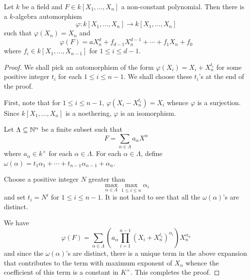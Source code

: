 \begin{lemma}
    Let $k$ be a field and $F\in k[X_1,\dots,X_n]$ a non-constant polynomial. Then there is a $k$-algebra automorphism 
    \begin{equation*}
        \varphi: k[X_1,\dots,X_n]\to k[X_1,\dots,X_n]
    \end{equation*}
    such that $\varphi(X_n) = X_n$ and 
    \begin{equation*}
        \varphi(F) = aX_n^d + f_{d - 1}X_n^{d - 1} + \cdots + f_1X_n + f_0
    \end{equation*}
    where $f_i\in k[X_1,\dots,X_{n - 1}]$ for $1\le i\le d - 1$.
\end{lemma}
\begin{proof}
    We shall pick an automorphism of the form $\varphi(X_i) = X_i + X_n^{t_i}$ for some positive integer $t_i$ for each $1\le i\le n - 1$. We shall choose these $t_i$'s at the end of the proof.

    First, note that for $1\le i\le n - 1$, $\varphi(X_i - X_n^{t_i}) = X_i$ whence $\varphi$ is a surjection. Since $k[X_1,\dots,X_n]$ is a noethering, $\varphi$ is an isomorphism.

    Let $\Lambda\subseteq\mathbb{N}^n$ be a finite subset such that 
    \begin{equation*}
        F = \sum_{\alpha\in\Lambda}a_\alpha X^\alpha
    \end{equation*}
    where $a_\alpha\in k^\times$ for each $\alpha\in\Lambda$. For each $\alpha\in\Lambda$, define $\omega(\alpha) = t_1\alpha_1 + \cdots + t_{n - 1}\alpha_{n - 1} + \alpha_n$.

    Choose a positive integer $N$ greater than 
    \begin{equation*}
        \max_{\alpha\in\Lambda}\max_{1\le i\le n}\alpha_i
    \end{equation*}
    and set $t_i = N^i$ for $1\le i\le n - 1$. It is not hard to see that all the $\omega(\alpha)$'s are distinct. 

    We have 
    \begin{equation*}
        \varphi(F) = \sum_{\alpha\in\Lambda}\left(a_\alpha\prod_{i = 1}^{n - 1}(X_i + X_n^{t_i})^{\alpha_i}\right)X_n^{\alpha_n}
    \end{equation*}
    and since the $\omega(\alpha)$'s are distinct, there is a unique term in the above expansion that contributes to the term with maximum exponent of $X_n$ whence the coefficient of this term is a constant in $K^\times$. This completes the proof.
\end{proof}

